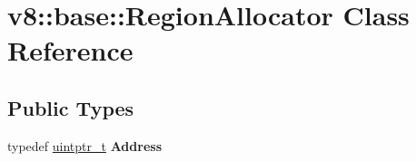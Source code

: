 \hypertarget{classv8_1_1base_1_1RegionAllocator}{}\section{v8\+:\+:base\+:\+:Region\+Allocator Class Reference}
\label{classv8_1_1base_1_1RegionAllocator}
\subsection*{Public Types}
\begin{DoxyCompactItemize}
\item 
\mbox{\label{classv8_1_1base_1_1RegionAllocator_a2929e4abcf2bf700325decd544d2e3e2}} 
typedef \mbox{\hyperlink{classuintptr__t}{uintptr\+\_\+t}} {\bfseries Address}
\end{DoxyCompactItemize}
